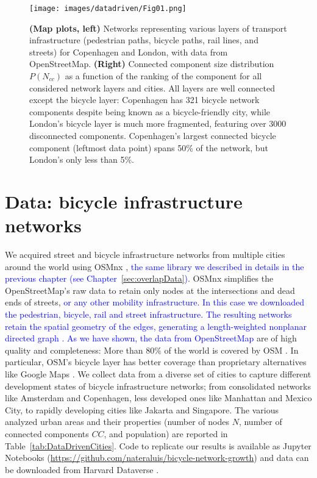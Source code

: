\begin{figure}[th!]
  \centering
  \texttt{[image: images/datadriven/Fig01.png]}
  \caption[Multimodal configuration]{\textbf{(Map plots, left)} Networks representing various layers of transport infrastructure (pedestrian paths, bicycle paths, rail lines, and streets) for Copenhagen and London, with data from OpenStreetMap. \textbf{(Right)} Connected component size distribution $P(N_{cc})$ as a function of the ranking of the component for all considered network layers and cities. All layers are well connected except the bicycle layer: Copenhagen has 321 bicycle network components despite being known as a bicycle-friendly city, while London's bicycle layer is much more fragmented, featuring over 3000 disconnected components. Copenhagen's largest connected bicycle component (leftmost data point) spans 50\% of the network, but London's only less than 5\%.}
  \label{fig:Multimodal}
\end{figure}

\section{Data: bicycle infrastructure networks}
We acquired street and bicycle infrastructure networks from multiple cities around the world using OSMnx \cite{boeing2017osmnx}, \textcolor{blue}{the same library we described in details in the previous chapter (see Chapter~\ref{sec:overlapData})}. OSMnx simplifies the OpenStreetMap's raw data to retain only nodes at the intersections and dead ends of streets, \textcolor{blue}{or any other mobility infrastructure. In this case we downloaded the pedestrian, bicycle, rail and street infrastructure. The resulting networks retain the spatial geometry of the edges, generating a length-weighted nonplanar directed graph \cite{Boeing2020Planarity}. As we have shown, the data from OpenStreetMap} are of high quality \cite{haklay2010openstreetmap,girres2010quality,Ferster2019Bicycle} and completeness: More than $80\%$ of the world is covered by OSM \cite{barbosa2018human}. In particular, OSM's bicycle layer has better coverage than proprietary alternatives like Google Maps \cite{Hochmair2012}. We collect data from a diverse set of cities to capture different development states of bicycle infrastructure networks; from consolidated networks like Amsterdam and Copenhagen, less developed ones like Manhattan and Mexico City, to rapidly developing cities like Jakarta and Singapore. The various analyzed urban areas and their properties (number of nodes $N$, number of connected components $CC$, and population) are reported in Table~\ref{tab:DataDrivenCities}. Code to replicate our results is available as Jupyter Notebooks (\url{https://github.com/nateraluis/bicycle-network-growth}) and data can be downloaded from Harvard Dataverse \cite{natera2019data}.

